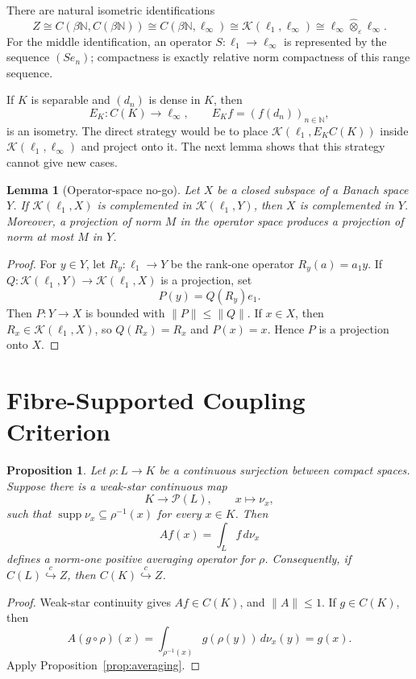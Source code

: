 \documentclass[11pt]{article}
\newtheorem{proposition}[theorem]{Proposition}
\newtheorem{lemma}[theorem]{Lemma}
\theoremstyle{definition}
\theoremstyle{remark}
\newcommand{\C}{C}
\newcommand{\bN}{\beta\mathbb N}
\newcommand{\Pp}{\mathcal P}
\newcommand{\Kop}{\mathcal K}
\newcommand{\hookc}{\stackrel{c}{\hookrightarrow}}
\begin{document}
There are natural isometric identifications
\[
 Z
 \cong \C(\bN,\C(\bN))
 \cong \C(\bN,\ell_\infty)
 \cong \Kop(\ell_1,\ell_\infty)
 \cong \ell_\infty\widehat\otimes_\varepsilon\ell_\infty.
\]
For the middle identification, an operator \(S:\ell_1\to\ell_\infty\) is
represented by the sequence \((Se_n)\); compactness is exactly relative
norm compactness of this range sequence.

If \(K\) is separable and \((d_n)\) is dense in \(K\), then
\[
       E_K:\C(K)\to\ell_\infty,\qquad E_Kf=(f(d_n))_{n\in\mathbb N},
\]
is an isometry.  The direct strategy would be to place
\(\Kop(\ell_1,E_K\C(K))\) inside \(\Kop(\ell_1,\ell_\infty)\) and project
onto it.  The next lemma shows that this strategy cannot give new cases.

\begin{lemma}[Operator-space no-go]\label{lem:no-go}
Let \(X\) be a closed subspace of a Banach space \(Y\).  If
\(\Kop(\ell_1,X)\) is complemented in \(\Kop(\ell_1,Y)\), then \(X\) is
complemented in \(Y\).  Moreover, a projection of norm \(M\) in the
operator space produces a projection of norm at most \(M\) in \(Y\).
\end{lemma}

\begin{proof}
For \(y\in Y\), let \(R_y:\ell_1\to Y\) be the rank-one operator
\(R_y(a)=a_1y\).  If \(Q:\Kop(\ell_1,Y)\to\Kop(\ell_1,X)\) is a projection,
set
\[
       P(y)=Q(R_y)e_1.
\]
Then \(P:Y\to X\) is bounded with \(\|P\|\leq\|Q\|\).  If \(x\in X\), then
\(R_x\in\Kop(\ell_1,X)\), so \(Q(R_x)=R_x\) and \(P(x)=x\).  Hence \(P\) is
a projection onto \(X\).
\end{proof}

\section{Fibre-Supported Coupling Criterion}

\begin{proposition}\label{prop:coupling}
Let \(\rho:L\to K\) be a continuous surjection between compact spaces.
Suppose there is a weak-star continuous map
\[
       K\to\Pp(L),\qquad x\mapsto\nu_x,
\]
such that \(\operatorname{supp}\nu_x\subseteq\rho^{-1}(x)\) for every
\(x\in K\).  Then
\[
       Af(x)=\int_L f\,d\nu_x
\]
defines a norm-one positive averaging operator for \(\rho\).  Consequently,
if \(\C(L)\hookc Z\), then \(\C(K)\hookc Z\).
\end{proposition}

\begin{proof}
Weak-star continuity gives \(Af\in\C(K)\), and \(\|A\|\leq1\).  If
\(g\in\C(K)\), then
\[
A(g\circ\rho)(x)=\int_{\rho^{-1}(x)}g(\rho(y))\,d\nu_x(y)=g(x).
\]
Apply Proposition~\ref{prop:averaging}.
\end{proof}
\end{document}
